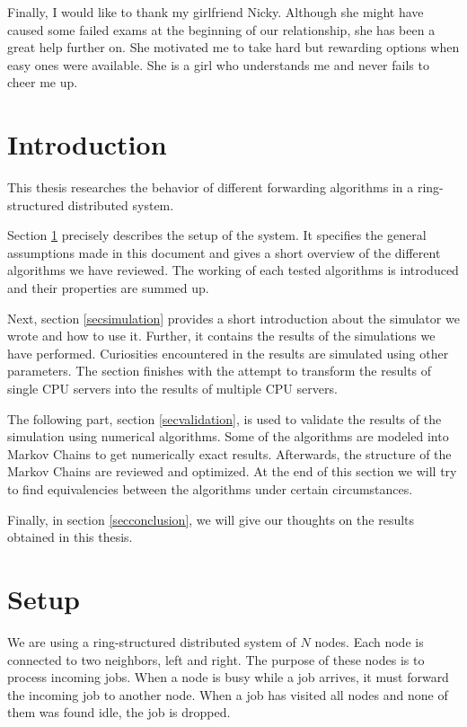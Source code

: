\documentclass[10pt,a4paper]{article}
\begin{document}
Finally, I would like to thank my girlfriend Nicky. Although she might have caused some failed exams at the beginning of our relationship, she has been a great help further on. She motivated me to take hard but rewarding options when easy ones were available. She is a girl who understands me and never fails to cheer me up.

\newpage

\tableofcontents

\newpage

\section*{Introduction}
This thesis researches the behavior of different forwarding algorithms in a ring-structured distributed system.

Section \ref{secsetup} precisely describes the setup of the system. It specifies the general assumptions made in this document and gives a short overview of the different algorithms we have reviewed. The working of each tested algorithms is introduced and their properties are summed up.

Next, section \ref{secsimulation} provides a short introduction about the simulator we wrote and how to use it. Further, it contains the results of the simulations we have performed. Curiosities encountered in the results are simulated using other parameters. The section finishes with the attempt to transform the results of single CPU servers into the results of multiple CPU servers.

The following part, section \ref{secvalidation}, is used to validate the results of the simulation using numerical algorithms. Some of the algorithms are modeled into Markov Chains to get numerically exact results. Afterwards, the structure of the Markov Chains are reviewed and optimized. At the end of this section we will try to find equivalencies between the algorithms under certain circumstances.

Finally, in section \ref{secconclusion}, we will give our thoughts on the results obtained in this thesis.

\section{Setup}
\label{secsetup}
We are using a ring-structured distributed system of $N$ nodes. Each node is connected to two neighbors, left and right. The purpose of these nodes is to process incoming jobs. When a node is busy while a job arrives, it must forward the incoming job to another node. When a job has visited all nodes and none of them was found idle, the job is dropped.
\end{document}
